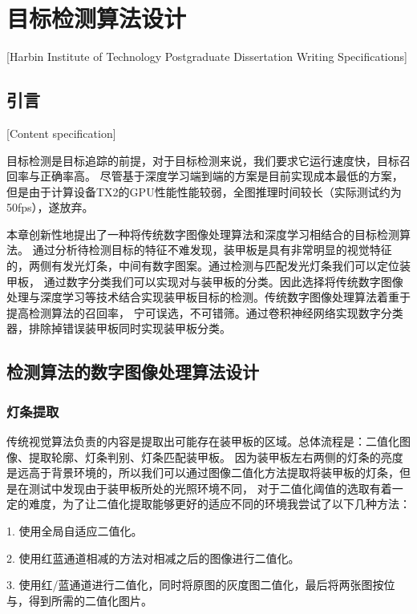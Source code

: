 
\chapter[目标检测算法设计]{目标检测算法设计}[Harbin Institute of Technology Postgraduate Dissertation Writing Specifications]



\section{引言}[Content specification]

目标检测是目标追踪的前提，对于目标检测来说，我们要求它运行速度快，目标召回率与正确率高。
尽管基于深度学习端到端的方案是目前实现成本最低的方案，但是由于计算设备TX2的GPU性能性能较弱，全图推理时间较长（实际测试约为50fps），遂放弃。
\par
本章创新性地提出了一种将传统数字图像处理算法和深度学习相结合的目标检测算法。
通过分析待检测目标的特征不难发现，装甲板是具有非常明显的视觉特征的，两侧有发光灯条，中间有数字图案。通过检测与匹配发光灯条我们可以定位装甲板，
通过数字分类我们可以实现对与装甲板的分类。因此选择将传统数字图像处理与深度学习等技术结合实现装甲板目标的检测。传统数字图像处理算法着重于提高检测算法的召回率，
宁可误选，不可错筛。通过卷积神经网络实现数字分类器，排除掉错误装甲板同时实现装甲板分类。




\section{检测算法的数字图像处理算法设计}

\subsection{灯条提取}
传统视觉算法负责的内容是提取出可能存在装甲板的区域。总体流程是：二值化图像、提取轮廓、灯条判别、灯条匹配装甲板。
因为装甲板左右两侧的灯条的亮度是远高于背景环境的，所以我们可以通过图像二值化方法提取将装甲板的灯条，但是在测试中发现由于装甲板所处的光照环境不同，
对于二值化阈值的选取有着一定的难度，为了让二值化提取能够更好的适应不同的环境我尝试了以下几种方法：\par
1. 使用全局自适应二值化。\par
2. 使用红蓝通道相减的方法对相减之后的图像进行二值化。\par
3. 使用红/蓝通道进行二值化，同时将原图的灰度图二值化，最后将两张图按位与，得到所需的二值化图片。\par

